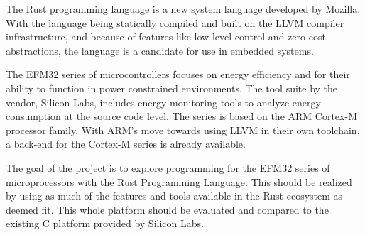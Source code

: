 
\label{chap:problem}

The Rust programming language is a new system language developed by Mozilla.
With the language being statically compiled and built on the LLVM compiler infrastructure, and because of features like low-level control and zero-cost abstractions, the language is a candidate for use in embedded systems.

The EFM32 series of microcontrollers focuses on energy efficiency and for their ability to function in power constrained environments.
The tool suite by the vendor, Silicon Labs, includes energy monitoring tools to analyze energy consumption at the source code level.
The series is based on the ARM Cortex-M processor family.
With ARM's move towards using LLVM in their own toolchain, a back-end for the Cortex-M series is already available.

The goal of the project is to explore programming for the EFM32 series of microprocessors with the Rust Programming Language.
This should be realized by using as much of the features and tools available in the Rust ecosystem as deemed fit.
This whole platform should be evaluated and compared to the existing C platform provided by Silicon Labs.
